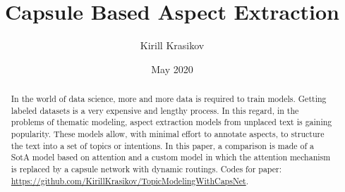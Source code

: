 \documentclass{article}
\title{Capsule Based Aspect Extraction}
\author{Kirill Krasikov}
\date{May 2020}
\begin{document}
\maketitle
\begin{abstract}
    In the world of data science, more and more data is required to train models. Getting labeled datasets is a very expensive and lengthy process. In this regard, in the problems of thematic modeling, aspect extraction models from unplaced text is gaining popularity. These models allow, with minimal effort to annotate aspects, to structure the text into a set of topics or intentions. In this paper, a comparison is made of a SotA model based on attention and a custom model in which the attention mechanism is replaced by a capsule network with dynamic routings. 
    Codes for paper: \url{https://github.com/KirillKrasikov/TopicModelingWithCapsNet}.
\end{abstract}
\end{document}
